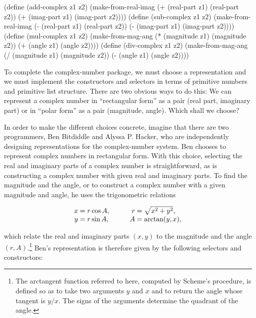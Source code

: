 \begin{codeBlock}
(define (add-complex z1 z2)
  (make-from-real-imag (+ (real-part z1)
                          (real-part z2))
                       (+ (imag-part z1)
                          (imag-part z2))))
(define (sub-complex z1 z2)
  (make-from-real-imag (- (real-part z1)
                          (real-part z2))
                       (- (imag-part z1)
                          (imag-part z2))))
(define (mul-complex z1 z2)
  (make-from-mag-ang (* (magnitude z1)
                        (magnitude z2))
                     (+ (angle z1)
                        (angle z2))))
(define (div-complex z1 z2)
  (make-from-mag-ang (/ (magnitude z1)
                        (magnitude z2))
                     (- (angle z1)
                        (angle z2))))
\end{codeBlock}

\noindent
To complete the complex-number package, we must choose a representation and we
must implement the constructors and selectors in terms of primitive numbers and
primitive list structure.  There are two obvious ways to do this: We can
represent a complex number in ``rectangular form'' as a pair (real part,
imaginary part) or in ``polar form'' as a pair (magnitude, angle).  Which shall
we choose?

In order to make the different choices concrete, imagine that there are two
programmers, Ben Bitdiddle and Alyssa P. Hacker, who are independently
designing representations for the complex-number system.  Ben chooses to
represent complex numbers in rectangular form.  With this choice, selecting the
real and imaginary parts of a complex number is straightforward, as is
constructing a complex number with given real and imaginary parts.  To find the
magnitude and the angle, or to construct a complex number with a given
magnitude and angle, he uses the trigonometric relations

$$
\begin{array}{r@{{}={}}lr@{{}={}}l}
	x & r \cos A, \qquad 	& r & \sqrt{x^2 + y^2}, \\
	y & r \sin A, \qquad 	& A & \arctan(y, x),
\end{array}
$$

\noindent
which relate the real and imaginary parts \( (x, y) \) to the magnitude and
the angle \( (r, A) \).\footnote{The arctangent function referred to here,
computed by Scheme's  procedure, is defined so as to take two
arguments \( y \) and \( x \) and to return the angle whose tangent is \( y / x \).
The signs of the arguments determine the quadrant of the angle.}  Ben's
representation is therefore given by the following selectors and constructors:

